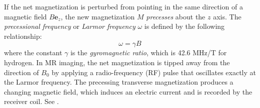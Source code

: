 If the net magnetization is perturbed from pointing in the same direction of a magnetic field $B\bm{e}_z$, the new magnetization $M$ \textit{precesses} about the $z$ axis. The \textit{precessional frequency} or \textit{Larmor frequency} $\omega$ is defined by the following relationship:
\begin{equation}
\omega = \gamma B
\end{equation}
where the constant $\gamma$ is the \textit{gyromagnetic ratio}, which is 42.6 MHz/T for hydrogen. In MR imaging, the net magnetization is tipped away from the direction of $B_0$ by applying a radio-frequency (RF) pulse that oscillates exactly at the Larmor frequency. The precessing transverse magnetization produces a changing magnetic field, which induces an electric current and is recorded by the receiver coil. See .

